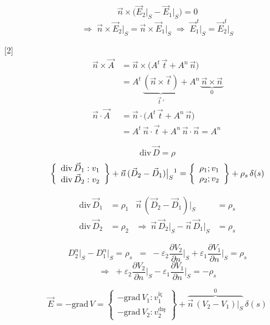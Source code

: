 \documentclass[11pt,a4paper]{article}
\begin{document}
\[ \vec n\times\bigl(\vec E_2\big|_S-\vec E_1\big|_S\bigr) = 0 \]
\[ \Rightarrow\; \vec n\times\vec E_2\big|_S = \vec n\times\vec E_1\big|_S \;\Rightarrow\; \vec E_1^{\,t}\big|_S = \vec E_2^{\,t}\big|_S \]

[2]
\begin{align*}
\vec n\times\vec A &= \vec n\times\bigl(A^t\,\vec t + A^n\,\vec n\bigr) \\
 &= A^t\,\underbrace{(\vec n\times\vec t)}_{\vec t\,'} + A^n\,\underbrace{\vec n\times\vec n}_{0} \\
\vec n\cdot\vec A &= \vec n\cdot\bigl(A^t\,\vec t + A^n\,\vec n\bigr) \\
 &= A^t\,\vec n\cdot\vec t + A^n\,\vec n\cdot\vec n = A^n
\end{align*}

\[ \mathrm{div}\,\vec D = \rho \]
\[ \left\{\begin{array}{l}\mathrm{div}\,\vec D_1 : v_1\\ \mathrm{div}\,\vec D_2 : v_2\end{array}\right\} + \vec n\,(\vec D_2-\vec D_1)\big|_S\text{\footnotemark} = \left\{\begin{array}{l}\rho_1 ; v_1\\ \rho_2 ; v_2\end{array}\right\} + \rho_s\,\delta(s) \]

\begin{align*}
\mathrm{div}\,\vec D_1 &= \rho_1 & \vec n\,(\vec D_2-\vec D_1)\big|_S &= \rho_s \\
\mathrm{div}\,\vec D_2 &= \rho_2 & \Rightarrow\ \vec n\,\vec D_2\big|_S - \vec n\,\vec D_1\big|_S &= \rho_s
\end{align*}

\[ D_2^n\big|_S - D_1^n\big|_S = \rho_s \;\;=\; -\varepsilon_2\frac{\partial V_2}{\partial n}\Big|_S + \varepsilon_1\frac{\partial V_1}{\partial n}\Big|_S = \rho_s \]
\[ \Rightarrow\; +\varepsilon_2\frac{\partial V_2}{\partial n}\Big|_S - \varepsilon_1\frac{\partial V_1}{\partial n}\Big|_S = -\rho_s \]

\[ \vec E = -\mathrm{grad}\,V = \left\{\begin{array}{l}-\mathrm{grad}\,V_1 : v_1^{\text{iç}}\\ -\mathrm{grad}\,V_2 : v_2^{\text{dış}}\end{array}\right\} + \overbrace{\vec n\,(V_2-V_1)\big|_S}^{0}\,\delta(s) \]
\end{document}
